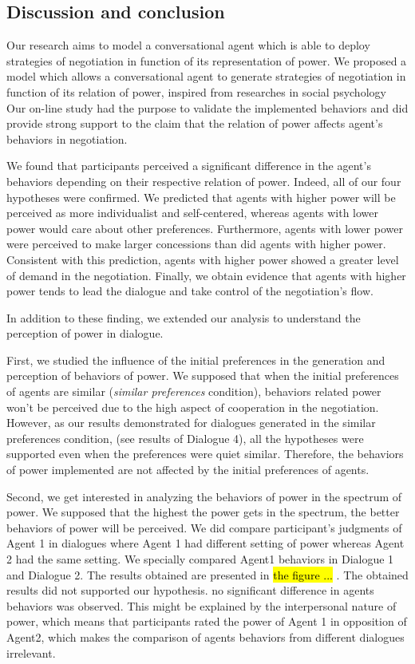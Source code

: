 \documentclass{llncs}
\begin{document}
	\subsection{Discussion and conclusion}
	
	Our research aims to model a conversational agent which is able to deploy strategies of negotiation in function of its representation of power. 
	We proposed a model which allows a conversational agent to generate strategies of negotiation in function of its relation of power, inspired from researches in social psychology
	Our on-line study had the purpose to validate the implemented behaviors and did provide strong support to the claim that the relation of power affects agent's behaviors in negotiation.
	
	We found that participants perceived a significant difference in the agent's behaviors depending on their respective relation of power.  
	Indeed, all of our four hypotheses were confirmed. We predicted that agents with higher power will be perceived as more individualist and self-centered, whereas agents with lower power would care about other preferences. Furthermore, agents with lower power were perceived to make larger concessions than did agents with higher power. Consistent with this prediction, agents with higher power showed a greater level of demand in the negotiation. Finally, we obtain evidence that agents with higher power tends to lead the dialogue and take control of the negotiation's flow. 
	
	In addition to these finding, we extended our analysis to understand the perception of power in dialogue.
	
	First, we studied the influence of the initial preferences in the generation and perception of behaviors of power.
	We supposed that when the initial preferences of agents are similar (\textit{similar preferences} condition), behaviors related power won't be perceived due to the high aspect of cooperation in the negotiation. However, as our results demonstrated for dialogues generated in the similar preferences condition, (see results of Dialogue 4), all the hypotheses were supported even when the preferences were quiet similar. Therefore, the behaviors of power implemented are not affected by the initial preferences of agents.
	
	Second, we get interested in analyzing the behaviors of power in the spectrum of power. We supposed that the highest the power gets in the spectrum, the better behaviors of power will be perceived. We did compare participant's judgments of Agent 1 in dialogues where Agent 1 had different setting of power whereas Agent 2 had the same setting. We specially compared Agent1 behaviors in Dialogue 1 and Dialogue 2. The results obtained are presented in \hl{the figure ... }.	
	The obtained results did not supported our hypothesis. no significant difference in agents behaviors was observed. This might be explained by the interpersonal nature of power, which means that participants rated the power of Agent 1 in opposition of Agent2, which makes the comparison of agents behaviors from different dialogues irrelevant. 
	
\end{document}
